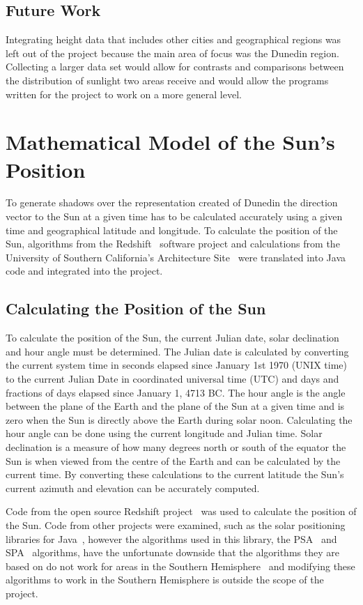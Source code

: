 \documentclass[12pt]{report}
\begin{document}
\subsection{Future Work}
Integrating height data that includes other cities and geographical regions was left out of the project because the main area of focus was the Dunedin region. Collecting a larger data set would allow for contrasts and comparisons between the distribution of sunlight two areas receive and would allow the programs written for the project to work on a more general level.

\section{Mathematical Model of the Sun's Position}
To generate shadows over the representation created of Dunedin the direction vector to the Sun at a given time has to be calculated accurately using a given time and geographical latitude and longitude. To calculate the position of the Sun, algorithms from the Redshift~\cite{redshift} software project and calculations from the University of Southern California's Architecture Site~\cite{solarazi} were translated into Java code and integrated into the project.

\subsection{Calculating the Position of the Sun}
To calculate the position of the Sun, the current Julian date, solar declination and hour angle must be determined. The Julian date is calculated by converting the current system time in seconds elapsed since January 1st 1970 (UNIX time) to the current Julian Date in coordinated universal time (UTC) and days and fractions of days elapsed since January 1, 4713 BC. The hour angle is the angle between the plane of the Earth and the plane of the Sun at a given time and is zero when the Sun is directly above the Earth during solar noon. Calculating the hour angle can be done using the current longitude and Julian time. Solar declination is a measure of how many degrees north or south of the equator the Sun is when viewed from the centre of the Earth and can be calculated by the current time. By converting these calculations to the current latitude the Sun's current azimuth and elevation can be accurately computed.

Code from the open source Redshift project~\cite{redshift} was used to calculate the position of the Sun.  Code from other projects were examined, such as the solar positioning libraries for Java~\cite{javasunlib}, however the algorithms used in this library, the PSA~\cite{psa} and SPA~\cite{spa} algorithms, have the unfortunate downside that the algorithms they are based on do not work for areas in the Southern Hemisphere~\cite{southsun} and modifying these algorithms to work in the Southern Hemisphere is outside the scope of the project.
\end{document}
